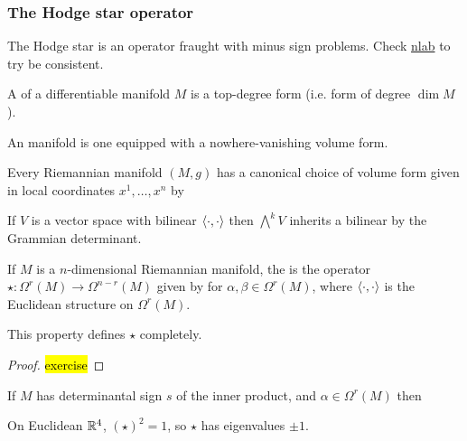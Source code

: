 \documentclass{article}
\begin{document}
\subsubsection{The Hodge star operator}
The Hodge star is an operator fraught with minus sign problems. Check \href{https://ncatlab.org/nlab/show/Hodge+star+operator}{nlab} to try be consistent. 

\begin{definition}
	A  of a differentiable manifold $M$ is a top-degree form (i.e. form of degree $\dim M$). 
\end{definition}

\begin{definition}
	An  manifold is one equipped with a nowhere-vanishing volume form. 
\end{definition}

\begin{lemma}
	Every Riemannian manifold $(M,g)$ has a canonical choice of volume form given in local coordinates $x^1, \dots, x^n$ by 
\end{lemma}

\begin{lemma}
	If $V$ is a vector space with bilinear $\left\langle \cdot, \cdot \right\rangle$ then $\bigwedge^k V$ inherits a bilinear by the Grammian determinant. 
\end{lemma}

\begin{definition}
	If $M$ is a $n$-dimensional Riemannian manifold, the  is the operator $\star : \Omega^r(M) \to \Omega^{n-r}(M)$ given by 
	for $\alpha,\beta \in \Omega^r(M)$, where $\left\langle \cdot,\cdot \right\rangle$ is the Euclidean structure on $\Omega^r(M)$. 
\end{definition}

\begin{lemma}
	This property defines $\star$ completely. 
\end{lemma}
\begin{proof}
	\hl{exercise}
\end{proof}

\begin{prop}
	If $M$ has determinantal sign $s$ of the inner product, and $\alpha \in \Omega^r(M)$ then 
\end{prop}
\begin{corollary}
	On Euclidean $\mathbb{R}^4$, $(\star)^2 = 1$, so $\star$ has eigenvalues $\pm 1$. 
\end{corollary}
\end{document}
